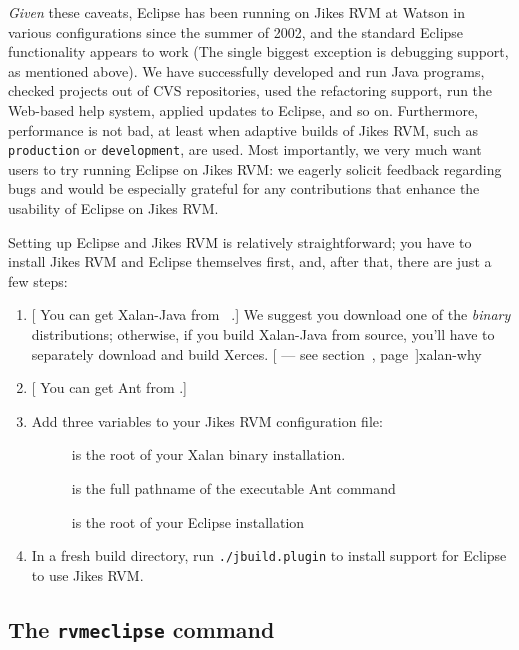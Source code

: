 {\it Given} these caveats, Eclipse has been running on Jikes RVM at
Watson in various configurations since the summer of 2002, and the
standard Eclipse functionality appears to work (The single biggest
exception is debugging support, as mentioned above).  We have
successfully developed and run Java programs, checked projects out of
CVS repositories, used the refactoring support, run the Web-based help
system, applied updates to Eclipse, and so on.  Furthermore,
performance is not bad, at least when adaptive builds of Jikes RVM,
such as {\tt production} or {\tt development}, are used.  Most
importantly, we very much want users to try running Eclipse on Jikes
RVM: we eagerly solicit feedback regarding bugs and would be
especially grateful for any contributions that enhance the usability
of Eclipse on Jikes RVM.\@

Setting up Eclipse and Jikes RVM is relatively straightforward; you
have to install Jikes RVM and Eclipse themselves first, and, after
that, there are just a few steps:
\begin{enumerate}
\item {}[  You can get Xalan-Java from {\tt
\xalanURL}.]{\xalanURL}  We suggest you download one of the {\it binary}
distributions; otherwise, if you build Xalan-Java from source,  you'll have to
separately download and build Xerces.  [ --- see section~\Ref, page~\Pageref{}]{xalan-why}
\item {}[  You can get Ant from {\tt \antURL}.]{\antURL} 
\item Add three variables to your Jikes RVM configuration file:
 \begin{description}
 \item[] is the root of your Xalan binary
 installation.  
 \item[] is the full pathname of the executable Ant command
 \item[] is the root of your Eclipse installation
 \end{description}
\item In a fresh build directory, run {\tt ./jbuild.plugin} to install
support for Eclipse to use Jikes RVM.\@
\end{enumerate}

\subsection{The {\tt rvmeclipse} command}

